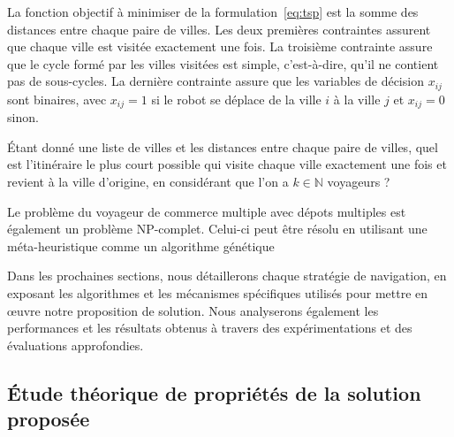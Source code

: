 \documentclass[francais,RandD]{rapportPFE}
\begin{document}
				La fonction objectif à minimiser de la formulation~\ref{eq:tsp} est la somme des distances entre chaque paire de villes.
				Les deux premières contraintes assurent que chaque ville est visitée exactement une fois.
				La troisième contrainte assure que le cycle formé par les villes visitées est simple, c'est-à-dire, qu'il ne contient pas de sous-cycles.
				La dernière contrainte assure que les variables de décision $x_{ij}$ sont binaires, avec $x_{ij} = 1$ si le robot se déplace de la ville $i$ à la ville $j$ et $x_{ij} = 0$ sinon.

				\begin{Definition}
					\label{def:mtsp}
					Étant donné une liste de villes et les distances entre chaque paire de villes, quel est l'itinéraire le plus court possible qui visite chaque ville exactement une fois et revient à la ville d'origine, en considérant que l'on a $k \in \mathbb{N}$ voyageurs ?
				\end{Definition}

				Le problème du voyageur de commerce multiple avec dépots multiples est également un problème NP-complet.
				Celui-ci peut être résolu en utilisant une méta-heuristique comme un algorithme génétique~\cite{SinghMTSP, Kiraly2011}

				Dans les prochaines sections, nous détaillerons chaque stratégie de navigation, en exposant les algorithmes et les mécanismes spécifiques utilisés pour mettre en œuvre notre proposition de solution. Nous analyserons également les performances et les résultats obtenus à travers des expérimentations et des évaluations approfondies.
		\subsection{Étude théorique de propriétés de la solution proposée}
\end{document}
